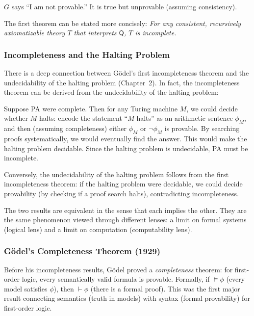 \begin{definition}
$G$ says ``I am not provable.'' It is true but unprovable (assuming consistency).
\end{definition}

The first theorem can be stated more concisely: \emph{For any consistent, recursively axiomatizable theory $T$ that interprets $\mathsf{Q}$, $T$ is incomplete.}

\subsubsection*{Incompleteness and the Halting Problem}

There is a deep connection between Gödel's first incompleteness theorem and the undecidability of the halting problem (Chapter~2). In fact, the incompleteness theorem can be derived from the undecidability of the halting problem:

Suppose PA were complete. Then for any Turing machine $M$, we could decide whether $M$ halts: encode the statement ``$M$ halts'' as an arithmetic sentence $\phi_M$, and then (assuming completeness) either $\phi_M$ or $\neg \phi_M$ is provable. By searching proofs systematically, we would eventually find the answer. This would make the halting problem decidable. Since the halting problem is undecidable, PA must be incomplete.

Conversely, the undecidability of the halting problem follows from the first incompleteness theorem: if the halting problem were decidable, we could decide provability (by checking if a proof search halts), contradicting incompleteness.

The two results are equivalent in the sense that each implies the other. They are the same phenomenon viewed through different lenses: a limit on formal systems (logical lens) and a limit on computation (computability lens).

\subsubsection*{Gödel's Completeness Theorem (1929)}

Before his incompleteness results, Gödel proved a \emph{completeness} theorem: for first-order logic, every semantically valid formula is provable. Formally, if $\models \phi$ (every model satisfies $\phi$), then $\vdash \phi$ (there is a formal proof). This was the first major result connecting semantics (truth in models) with syntax (formal provability) for first-order logic.

